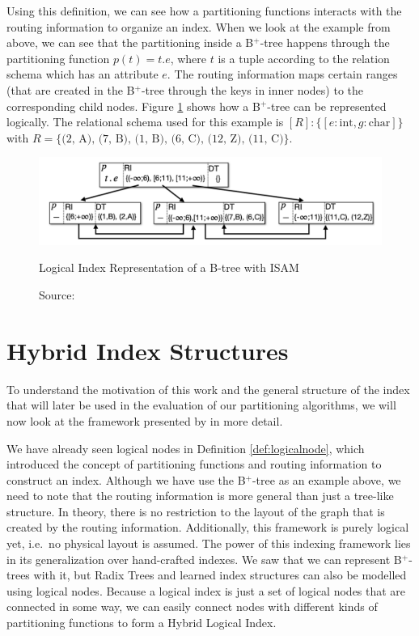 \noindent Using this definition, we can see how a partitioning functions interacts with the routing information to organize an index. When we look at the example from above, we can see that the partitioning inside a B$^+$-tree happens through the partitioning function $p(t) = t.e$, where $t$ is a tuple according to the relation schema which has an attribute $e$. The routing information maps certain ranges (that are created in the B$^+$-tree through the keys in inner nodes) to the corresponding child nodes. Figure \ref{fig:logical_btree} shows how a B$^+$-tree can be represented logically. The relational schema used for this example is $[R] : \{ [e:\text{int}, g:\text{char}] \}$ with $R = \{ \text{(2, A), (7, B), (1, B), (6, C), (12, Z), (11, C)}\}$.

\begin{figure}
    \centering
    \includegraphics[width=\textwidth]{figures/logical_btree.png}
    \caption{Logical Index Representation of a B-tree with ISAM}
    \caption*{\hfill Source: \citeauthor{Dittrich2021} \cite{Dittrich2021}}
    \label{fig:logical_btree}
\end{figure}

\section{Hybrid Index Structures}\label{bg:hybrid}
To understand the motivation of this work and the general structure of the index that will later be used in the evaluation of our partitioning algorithms, we will now look at the framework presented by \citeauthor{Dittrich2021} \cite{Dittrich2021} in more detail.

We have already seen logical nodes in Definition \ref{def:logicalnode}, which introduced the concept of partitioning functions and routing information to construct an index. Although we have use the B$^+$-tree as an example above, we need to note that the routing information is more general than just a tree-like structure. In theory, there is no restriction to the layout of the graph that is created by the routing information. Additionally, this framework is purely logical yet, i.e.~no physical layout is assumed. The power of this indexing framework lies in its generalization over hand-crafted indexes. We saw that we can represent B$^+$-trees with it, but Radix Trees and learned index structures can also be modelled using logical nodes. Because a logical index is just a set of logical nodes that are connected in some way, we can easily connect nodes with different kinds of partitioning functions to form a Hybrid Logical Index. 

